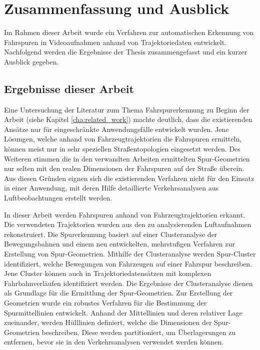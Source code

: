 
\chapter{Zusammenfassung und Ausblick}
\label{cha:end}

Im Rahmen dieser Arbeit wurde ein Verfahren zur automatischen Erkennung von Fahrspuren in Videoaufnahmen
anhand von Trajektoriedaten entwickelt.
Nachfolgend werden die Ergebnisse der Thesis zusammengefasst und ein kurzer Ausblick gegeben.

\section{Ergebnisse dieser Arbeit}

Eine Untersuchung der Literatur zum Thema Fahrspurerkennung zu Beginn der Arbeit
(siehe Kapitel \ref{cha:related_work}) machte deutlich, dass die existierenden Ansätze 
nur für eingeschränkte Anwendungsfälle entwickelt wurden. 
Jene Lösungen, welche anhand von Fahrzeugtrajektorien die Fahrspuren ermitteln, können meist nur
in sehr speziellen Straßentopologien eingesetzt werden.
Des Weiteren stimmen die in den verwandten Arbeiten ermittelten Spur-Geometrien nur selten mit den
realen Dimensionen der Fahrspuren auf der Straße überein.
Aus diesen Gründen eignen sich die existierenden Verfahren nicht für den Einsatz in einer
Anwendung, mit deren Hilfe detaillierte Verkehrsanalysen aus Luftbeobachtungen erstellt werden.

In dieser Arbeit werden Fahrspuren anhand von Fahrzeugtrajektorien erkannt. Die verwendeten Trajektorien
wurden aus den zu analysierenden Luftaufnahmen rekonstruiert.
Die Spurerkennung basiert auf einer Clusteranalyse der Bewegungsbahnen
und einem neu entwickelten, mehrstufigen Verfahren zur Erstellung von Spur-Geometrien.
Mithilfe der Clusteranalyse werden Spur-Cluster identifiziert, welche Bewegungen von Fahrzeugen auf einer Fahrspur beschreiben.
Jene Cluster können auch in Trajektoriedatensätzen mit komplexen Fahrbahnverläufen identifiziert werden.
Die Ergebnisse der Clusteranalyse dienen als Grundlage für die Ermittlung der Spur-Geometrien.
Zur Erstellung der Geometrien wurde ein robustes Verfahren für die Bestimmung der Spurmittellinien entwickelt.
Anhand der Mittellinien und deren relativer Lage zueinander, werden Hülllinien definiert,
welche die Dimensionen der Spur-Geometrien beschreiben. Diese werden partitioniert,
um Überlagerungen zu entfernen, bevor sie in den Verkehrsanalysen verwendet werden können.

